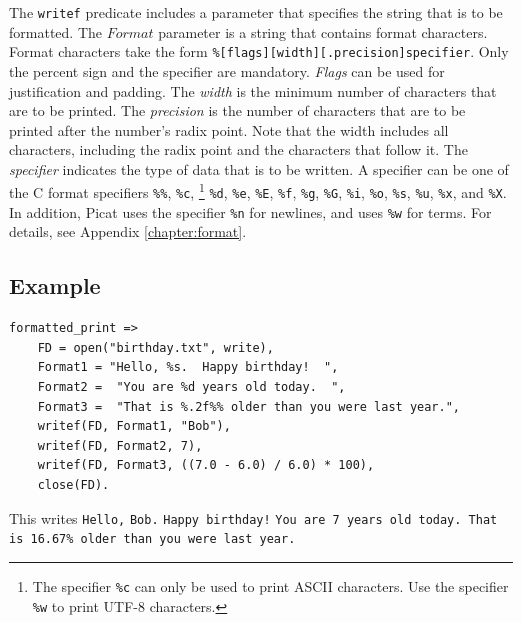 The \texttt{writef} predicate includes a parameter that specifies the string that is to be formatted.  The $Format$ parameter is a string that contains format characters.  Format characters take the form \texttt{\%[flags][width][.precision]specifier}.  Only the percent sign and the specifier are mandatory.  \emph{Flags} can be used for justification and padding.  The \emph{width} is the minimum number of characters that are to be printed.  The \emph{precision} is the number of characters that are to be printed after the number's radix point.  Note that the width includes all characters, including the radix point and the characters that follow it.  The \emph{specifier} indicates the type of data that is to be written.  A specifier can be one of the C format specifiers \texttt{\%\%}, \texttt{\%c}, \footnote{The specifier \texttt{\%c} can only be used to print ASCII characters. Use the specifier \texttt{\%w} to print UTF-8 characters.}  \texttt{\%d}, \texttt{\%e}, \texttt{\%E}, \texttt{\%f}, \texttt{\%g}, \texttt{\%G}, \texttt{\%i}, \texttt{\%o}, \texttt{\%s}, \texttt{\%u}, \texttt{\%x}, and \texttt{\%X}.  In addition, Picat uses the specifier \texttt{\%n} for newlines, and uses \texttt{\%w} for terms.  For details, see Appendix \ref{chapter:format}.

\subsection*{Example}
\begin{verbatim}
formatted_print =>
    FD = open("birthday.txt", write),
    Format1 = "Hello, %s.  Happy birthday!  ",
    Format2 =  "You are %d years old today.  ", 
    Format3 =  "That is %.2f%% older than you were last year.",
    writef(FD, Format1, "Bob"),
    writef(FD, Format2, 7),
    writef(FD, Format3, ((7.0 - 6.0) / 6.0) * 100),
    close(FD).
\end{verbatim}

This writes \texttt{Hello,} \texttt{Bob.}  \texttt{Happy birthday!}  \texttt{You are 7 years old today. That is 16.67\% older than you were last year.}
    
